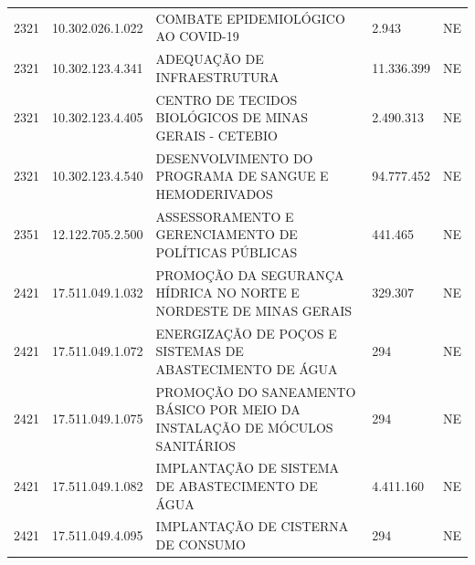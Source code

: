 \documentclass{article}
\begin{document}
\begin{longtable}[c]{m{1cm}|m{2cm}|m{10cm}|m{2cm}|m{1cm}}
\multicolumn{1}{C{1cm}|}{2321} & \multicolumn{1}{C{2cm}|}{10.302.026.1.022} & \multicolumn{1}{L{10cm}|}{COMBATE EPIDEMIOLÓGICO AO COVID-19} & \multicolumn{1}{R{2cm}|}{2.943} & \multicolumn{1}{C{1cm}}{NE} \\
\multicolumn{1}{C{1cm}|}{2321} & \multicolumn{1}{C{2cm}|}{10.302.123.4.341} & \multicolumn{1}{L{10cm}|}{ADEQUAÇÃO DE INFRAESTRUTURA} & \multicolumn{1}{R{2cm}|}{11.336.399} & \multicolumn{1}{C{1cm}}{NE} \\
\multicolumn{1}{C{1cm}|}{2321} & \multicolumn{1}{C{2cm}|}{10.302.123.4.405} & \multicolumn{1}{L{10cm}|}{CENTRO DE TECIDOS BIOLÓGICOS DE MINAS GERAIS - CETEBIO} & \multicolumn{1}{R{2cm}|}{2.490.313} & \multicolumn{1}{C{1cm}}{NE} \\
\multicolumn{1}{C{1cm}|}{2321} & \multicolumn{1}{C{2cm}|}{10.302.123.4.540} & \multicolumn{1}{L{10cm}|}{DESENVOLVIMENTO DO PROGRAMA DE SANGUE E HEMODERIVADOS} & \multicolumn{1}{R{2cm}|}{94.777.452} & \multicolumn{1}{C{1cm}}{NE} \\
\multicolumn{1}{C{1cm}|}{2351} & \multicolumn{1}{C{2cm}|}{12.122.705.2.500} & \multicolumn{1}{L{10cm}|}{ASSESSORAMENTO E GERENCIAMENTO DE POLÍTICAS PÚBLICAS} & \multicolumn{1}{R{2cm}|}{441.465} & \multicolumn{1}{C{1cm}}{NE} \\
\multicolumn{1}{C{1cm}|}{2421} & \multicolumn{1}{C{2cm}|}{17.511.049.1.032} & \multicolumn{1}{L{10cm}|}{PROMOÇÃO DA SEGURANÇA HÍDRICA NO NORTE E NORDESTE DE MINAS GERAIS} & \multicolumn{1}{R{2cm}|}{329.307} & \multicolumn{1}{C{1cm}}{NE} \\
\multicolumn{1}{C{1cm}|}{2421} & \multicolumn{1}{C{2cm}|}{17.511.049.1.072} & \multicolumn{1}{L{10cm}|}{ENERGIZAÇÃO DE POÇOS E SISTEMAS DE ABASTECIMENTO DE ÁGUA} & \multicolumn{1}{R{2cm}|}{294} & \multicolumn{1}{C{1cm}}{NE} \\
\multicolumn{1}{C{1cm}|}{2421} & \multicolumn{1}{C{2cm}|}{17.511.049.1.075} & \multicolumn{1}{L{10cm}|}{PROMOÇÃO DO SANEAMENTO BÁSICO POR MEIO DA INSTALAÇÃO DE MÓCULOS SANITÁRIOS} & \multicolumn{1}{R{2cm}|}{294} & \multicolumn{1}{C{1cm}}{NE} \\
\multicolumn{1}{C{1cm}|}{2421} & \multicolumn{1}{C{2cm}|}{17.511.049.1.082} & \multicolumn{1}{L{10cm}|}{IMPLANTAÇÃO DE SISTEMA DE ABASTECIMENTO DE ÁGUA} & \multicolumn{1}{R{2cm}|}{4.411.160} & \multicolumn{1}{C{1cm}}{NE} \\
\multicolumn{1}{C{1cm}|}{2421} & \multicolumn{1}{C{2cm}|}{17.511.049.4.095} & \multicolumn{1}{L{10cm}|}{IMPLANTAÇÃO DE CISTERNA DE CONSUMO} & \multicolumn{1}{R{2cm}|}{294} & \multicolumn{1}{C{1cm}}{NE} \\

\end{longtable}
\end{document}
